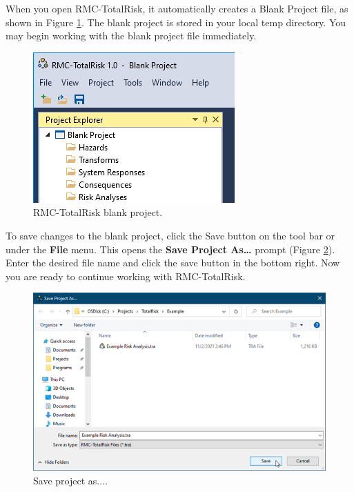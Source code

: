 \documentclass[
]{book}
\begin{document}
When you open RMC-TotalRisk, it automatically creates a Blank Project file, as shown in Figure \ref{fig:figure-48}. The blank project is stored in your local temp directory. You may begin working with the blank project file immediately.

\begin{figure}

{\centering \includegraphics{images/figure48} 

}

\caption{RMC-TotalRisk blank project.}\label{fig:figure-48}
\end{figure}

To save changes to the blank project, click the Save button on the tool bar or under the \textbf{File} menu. This opens the \textbf{Save Project As\ldots{}} prompt (Figure \ref{fig:figure-49}). Enter the desired file name and click the save button in the bottom right. Now you are ready to continue working with RMC-TotalRisk.

\begin{figure}

{\centering \includegraphics{images/figure49} 

}

\caption{Save project as....}\label{fig:figure-49}
\end{figure}
\end{document}

